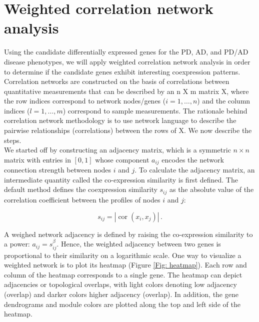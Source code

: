\section{Weighted correlation network analysis}
\label{sec:weight-corr-netw}

 Using the candidate differentially expressed genes for the PD, AD, and PD/AD disease phenotypes, we will apply weighted correlation network analysis in order to determine if the candidate genes exhibit interesting coexpression patterns. \\

 Correlation networks are constructed on the basis of correlations between quantitative measurements that can be described by an n X m matrix X, where the row indices correspond to network nodes/genes ($i = 1, \dots, n$) and the column indices ($l = 1, \dots, m$) correspond to sample measurements. The rationale behind correlation network methodology is to use network language to describe the pairwise relationships (correlations) between the rows of X. We now describe the steps.\\

We started off by constructing an adjacency matrix, which is a  symmetric $n \times n$ matrix with entries in $[0, 1]$ whose component $a_{ij}$ encodes the network connection strength between nodes $i$ and $j$. To calculate the adjacency matrix, an intermediate quantity called the co-expression similarity is first defined. The default method defines the coexpression similarity $s_{ij}$ as the absolute value of the correlation coefficient between the profiles of nodes $i$ and $j$:

\[s_{ij} = |\operatorname{cor}(x_i, x_j)| \,.\]

A weighed network adjacency is defined by raising the co-expression similarity to a power: $a_{ij} = s_{ij}^\beta$. Hence, the weighted adjacency between two genes is proportional to their similarity on a logarithmic scale. One way to visualize a weighted network is to plot its heatmap (Figure \ref{Fig: heatmap}). Each row and column of the heatmap corresponds to a single gene. The heatmap can depict adjacencies or topological overlaps, with light colors denoting low adjacency (overlap) and darker colors higher adjacency (overlap). In addition, the gene dendrograms and module colors are plotted along the top and left side of the heatmap.\\

